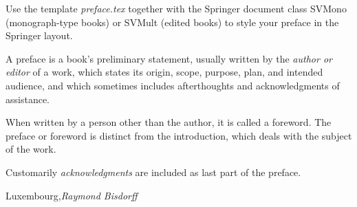%
%

\preface

Use the template \emph{preface.tex} together with the Springer document class SVMono (monograph-type books) or SVMult (edited books) to style your preface in the Springer layout.

A preface is a book's preliminary statement, usually written by the \textit{author or editor} of a work, which states its origin, scope, purpose, plan, and intended audience, and which sometimes includes afterthoughts and acknowledgments of assistance. 

When written by a person other than the author, it is called a foreword. The preface or foreword is distinct from the introduction, which deals with the subject of the work.

Customarily \textit{acknowledgments} are included as last part of the preface.
 

\vspace{\baselineskip}
\begin{flushright}\noindent
Luxembourg,\hfill {\it Raymond Bisdorff}\\
\end{flushright}


